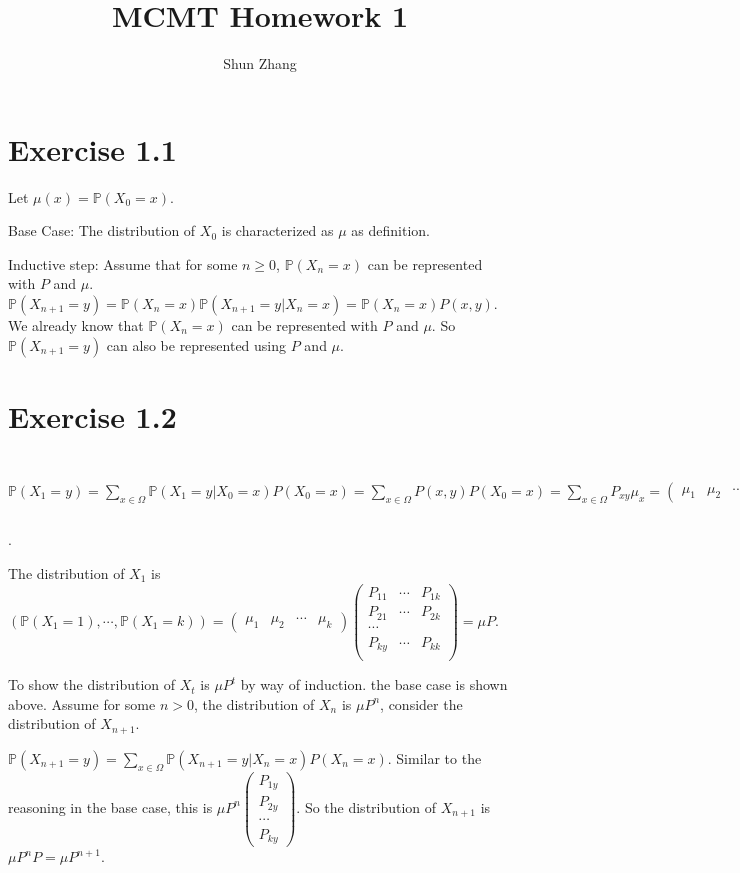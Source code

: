 \documentclass[10pt]{article}
\title{MCMT Homework 1}
\author{Shun Zhang}
\date{}
\renewcommand{\P}{\mathbb{P}}
\begin{document}
\maketitle

\section*{Exercise 1.1}

Let $\mu(x) = \P(X_0 = x)$.

Base Case: The distribution of $X_0$ is characterized as $\mu$ as definition.

Inductive step: Assume that for some $n \geq 0$, $\P(X_n = x)$ can be
represented with $P$ and $\mu$. $\P(X_{n+1} = y) = \P(X_n = x) \P(X_{n+1} = y |
X_n = x) = \P(X_n = x) P(x, y)$. We already know that $\P(X_n = x)$ can be
represented with $P$ and $\mu$. So $\P(X_{n+1} = y)$ can also be represented
using $P$ and $\mu$.

\section*{Exercise 1.2}

$\P(X_1 = y)
= \sum_{x \in \Omega} \P(X_1 = y | X_0 = x) P(X_0 = x)
= \sum_{x \in \Omega} P(x, y) P(X_0 = x)
= \sum_{x \in \Omega} P_{xy} \mu_x
= \begin{pmatrix}
  \mu_1 & \mu_2 & \cdots & \mu_k
  \end{pmatrix}
  \begin{pmatrix}
  P_{1y} \\
  P_{2y} \\
  \cdots \\
  P_{ky}
  \end{pmatrix}
$.

The distribution of $X_1$ is $(\P(X_1 = 1), \cdots, \P(X_1 = k))
= \begin{pmatrix}
  \mu_1 & \mu_2 & \cdots & \mu_k
  \end{pmatrix}
  \begin{pmatrix}
  P_{11} & \cdots & P_{1k} \\
  P_{21} & \cdots & P_{2k} \\
  \cdots \\
  P_{ky} & \cdots & P_{kk} \\
  \end{pmatrix}
= \mu P
$.

To show the distribution of $X_t$ is $\mu P^t$ by way of induction. the base
case is shown above. Assume for some $n > 0$, the distribution of $X_n$ is  $\mu
P^n$, consider the distribution of $X_{n+1}$.

$\P(X_{n+1} = y) 
= \sum_{x \in \Omega} \P(X_{n+1} = y | X_n = x) P(X_n = x)
$. Similar to the reasoning in the base case, this is
$ \mu P^n
  \begin{pmatrix}
  P_{1y} \\
  P_{2y} \\
  \cdots \\
  P_{ky}
  \end{pmatrix}
$. So the distribution of $X_{n+1}$ is $\mu P^n P = \mu P^{n+1}$.
\end{document}
